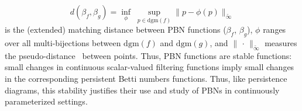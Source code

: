 \begin{equation*}\label{eq:pbn_stability}
	d(\beta_f, \beta_g) = \inf\limits_{\phi} \; \sup\limits_{p \in \mathrm{dgm}(f)} \lVert p - \phi(p) \rVert_{\widetilde{\infty} }
\end{equation*}
is the (extended) matching distance between PBN functions ($\beta_f$, $\beta_g$), $\phi$ ranges over all multi-bijections between $\mathrm{dgm}(f)$ and $\mathrm{dgm}(g)$, and $\lVert \,\cdot \, \rVert_{\widetilde{\infty}}$ measures the pseudo-distance~\cite{cerri2013betti} between points.
Thus, PBN functions are stable functions: small changes in continuous scalar-valued filtering functions imply small changes in the corresponding persistent Betti numbers functions. 
Thus, like persistence diagrams, this stability justifies their use and study of PBNs in continuously parameterized settings.










